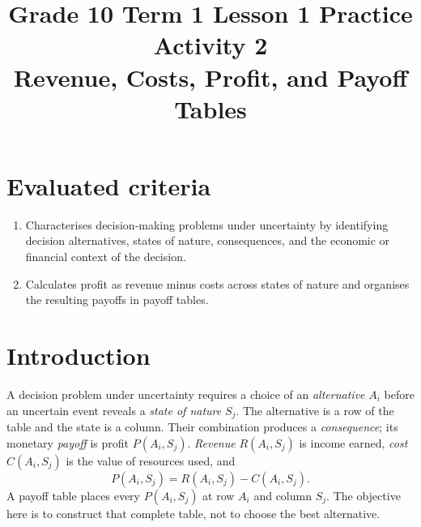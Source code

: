 \makeatletter
{}
\makeatother

\title{Grade 10 Term 1 Lesson 1 Practice Activity 2\\Revenue, Costs, Profit, and Payoff Tables}
\author{}
\date{}

\maketitle
\setcounter{tocdepth}{1}
\setcounter{secnumdepth}{2}
\label{toc}
\tableofcontents

\section*{Evaluated criteria}
\begin{enumerate}[label=\textbf{C\arabic*}]
\item Characterises decision-making problems under uncertainty by identifying decision alternatives, states of nature, consequences, and the economic or financial context of the decision.
\item[\textbf{C3}] Calculates profit as revenue minus costs across states of nature and organises the resulting payoffs in payoff tables.
\end{enumerate}

\section{Introduction}\label{sec:introduction}

\vspace{8mm}

A decision problem under uncertainty requires a choice of an
\emph{alternative} \(A_i\) before an uncertain event reveals a
\emph{state of nature} \(S_j\). The alternative is a row of the table and the
state is a column. Their combination produces a \emph{consequence}; its
monetary \emph{payoff} is profit \(P(A_i,S_j)\). \emph{Revenue}
\(R(A_i,S_j)\) is income earned, \emph{cost} \(C(A_i,S_j)\) is the value of
resources used, and
\[
P(A_i,S_j)=R(A_i,S_j)-C(A_i,S_j).
\]
A payoff table places every \(P(A_i,S_j)\) at row \(A_i\) and column \(S_j\).
The objective here is to construct that complete table, not to choose the best
alternative.


